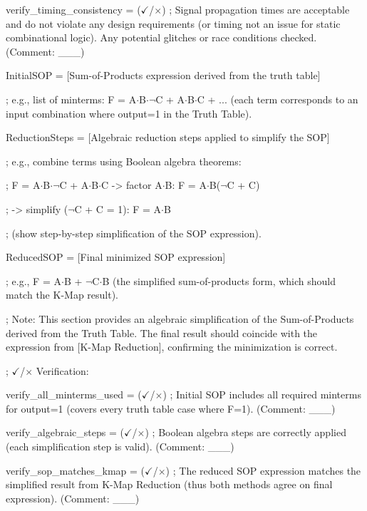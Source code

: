 \documentclass[11pt]{article}
\begin{document}
\noindent verify\_timing\_consistency = ($\checkmark$/$\times$) ; Signal propagation times are acceptable and do not violate any design requirements (or timing not an issue for static combinational logic). Any potential glitches or race conditions checked. (Comment: \_\_\_)

\vspace{0.5em}


\noindent InitialSOP = [Sum-of-Products expression derived from the truth table]

\noindent ; e.g., list of minterms: F = A$\cdot$B$\cdot$$\lnot$C + A$\cdot$B$\cdot$C + ... (each term corresponds to an input combination where output=1 in the Truth Table).

\noindent ReductionSteps = [Algebraic reduction steps applied to simplify the SOP]

\noindent ; e.g., combine terms using Boolean algebra theorems:

\noindent ;   F = A$\cdot$B$\cdot$$\lnot$C + A$\cdot$B$\cdot$C  -> factor A$\cdot$B: F = A$\cdot$B($\lnot$C + C)

\noindent ;   -> simplify ($\lnot$C + C = 1): F = A$\cdot$B

\noindent ;   (show step-by-step simplification of the SOP expression).

\noindent ReducedSOP = [Final minimized SOP expression]

\noindent ; e.g., F = A$\cdot$B + $\lnot$C$\cdot$B (the simplified sum-of-products form, which should match the K-Map result).

\noindent ; Note: This section provides an algebraic simplification of the Sum-of-Products derived from the Truth Table. The final result should coincide with the expression from [K-Map Reduction], confirming the minimization is correct.

\vspace{0.5em}

\noindent ; $\checkmark$/$\times$ Verification:

\noindent verify\_all\_minterms\_used = ($\checkmark$/$\times$) ; Initial SOP includes all required minterms for output=1 (covers every truth table case where F=1). (Comment: \_\_\_)

\noindent verify\_algebraic\_steps = ($\checkmark$/$\times$) ; Boolean algebra steps are correctly applied (each simplification step is valid). (Comment: \_\_\_)

\noindent verify\_sop\_matches\_kmap = ($\checkmark$/$\times$) ; The reduced SOP expression matches the simplified result from K-Map Reduction (thus both methods agree on final expression). (Comment: \_\_\_)
\end{document}
